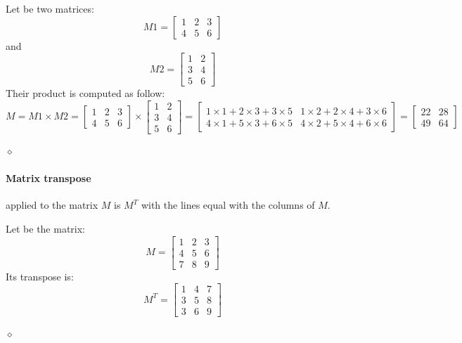 \begin{exemplu}
Let be two matrices:
\[
M1 = \begin{bmatrix}
    1 & 2 & 3 \\
    4 & 5 & 6
    \end{bmatrix}
\] 
and
\[
M2 = \begin{bmatrix}
    1 & 2  \\
    3 & 4 \\
    5 & 6 
    \end{bmatrix}
\]
Their product is computed as follow:
\[
M = M1 \times M2 = 
    \begin{bmatrix}
    1 & 2 & 3 \\
    4 & 5 & 6
    \end{bmatrix}
    \times
    \begin{bmatrix}
    1 & 2  \\
    3 & 4 \\
    5 & 6
    \end{bmatrix}
    = 
    \begin{bmatrix}
    1 \times 1 + 2 \times 3 + 3 \times 5 & 1 \times 2 + 2 \times 4 + 3 \times 6  \\
    4 \times 1 + 5 \times 3 + 6 \times 5 & 4 \times 2 + 5 \times 4 + 6 \times 6  
    \end{bmatrix}
    =
    \begin{bmatrix}
    22 & 28  \\
    49 & 64 
    \end{bmatrix}
\]

$\diamond$
\end{exemplu}

\paragraph{Matrix transpose} applied to the matrix $M$ is $M^T$ with the lines equal with the columns of $M$.

\begin{exemplu}
Let be the matrix:
\[
M = \begin{bmatrix}
    1 & 2 & 3 \\
    4 & 5 & 6\\
    7 & 8 & 9
    \end{bmatrix}
\]
Its transpose is:
\[
M^T = \begin{bmatrix}
    1 & 4 & 7 \\
    3 & 5 & 8\\
    3 & 6 & 9
    \end{bmatrix}
\]

$\diamond$
\end{exemplu}

